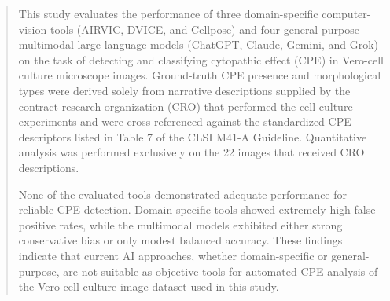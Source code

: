 \begin{abstract}
This study evaluates the performance of three domain-specific computer-vision tools (AIRVIC, DVICE, and Cellpose) and four general-purpose multimodal large language models (ChatGPT, Claude, Gemini, and Grok) on the task of detecting and classifying cytopathic effect (CPE) in Vero-cell culture microscope images. Ground-truth CPE presence and morphological types were derived solely from narrative descriptions supplied by the contract research organization (CRO) that performed the cell-culture experiments and were cross-referenced against the standardized CPE descriptors listed in Table 7 of the CLSI M41-A Guideline. Quantitative analysis was performed exclusively on the 22 images that received CRO descriptions.

None of the evaluated tools demonstrated adequate performance for reliable CPE detection. Domain-specific tools showed extremely high false-positive rates, while the multimodal models exhibited either strong conservative bias or only modest balanced accuracy. These findings indicate that current AI approaches, whether domain-specific or general-purpose, are not suitable as objective tools for automated CPE analysis of the Vero cell culture image dataset used in this study.
\end{abstract}